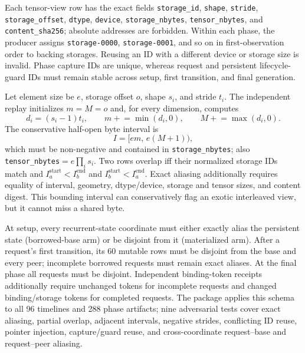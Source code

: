 \documentclass{article}
\begin{document}
Each tensor-view row has the exact fields
\texttt{storage\_id}, \texttt{shape}, \texttt{stride},
\texttt{storage\_offset}, \texttt{dtype}, \texttt{device},
\texttt{storage\_nbytes}, \texttt{tensor\_nbytes}, and
\texttt{content\_sha256}; absolute addresses are forbidden.  Within each
phase, the producer assigns \texttt{storage-0000}, \texttt{storage-0001},
and so on in first-observation order to backing storages.  Reusing an ID with
a different device or storage size is invalid.  Phase capture IDs are unique,
whereas request and persistent lifecycle-guard IDs must remain stable across
setup, first transition, and final generation.

Let element size be $e$, storage offset $o$, shape $s_i$, and stride $t_i$.
The independent replay initializes $m=M=o$ and, for every dimension, computes
\begin{equation}
  d_i=(s_i-1)t_i,\qquad
  m\mathrel{+}=\min(d_i,0),\qquad
  M\mathrel{+}=\max(d_i,0).
\end{equation}
The conservative half-open byte interval is
\begin{equation}
  I=[em,\,e(M+1)),
\end{equation}
which must be non-negative and contained in \texttt{storage\_nbytes}; also
\texttt{tensor\_nbytes}$=e\prod_i s_i$.  Two rows overlap iff their normalized
storage IDs match and $I_a^{\mathrm{start}}<I_b^{\mathrm{end}}$ and
$I_b^{\mathrm{start}}<I_a^{\mathrm{end}}$.  Exact aliasing additionally
requires equality of interval, geometry, dtype/device, storage and tensor
sizes, and content digest.  This bounding interval can conservatively flag an
exotic interleaved view, but it cannot miss a shared byte.

At setup, every recurrent-state coordinate must either exactly alias the
persistent state (borrowed-base arm) or be disjoint from it (materialized
arm).  After a request's first transition, its 60 mutable rows must be
disjoint from the base and every peer; incomplete borrowed requests must
remain exact aliases.  At the final phase all requests must be disjoint.
Independent binding-token receipts additionally require unchanged tokens for
incomplete requests and changed binding/storage tokens for completed requests.
The package applies this schema to all 96 timelines and 288 phase artifacts;
nine adversarial tests cover exact aliasing, partial overlap, adjacent
intervals, negative strides, conflicting ID reuse, pointer injection,
capture/guard reuse, and cross-coordinate request--base and request--peer
aliasing.
\end{document}
